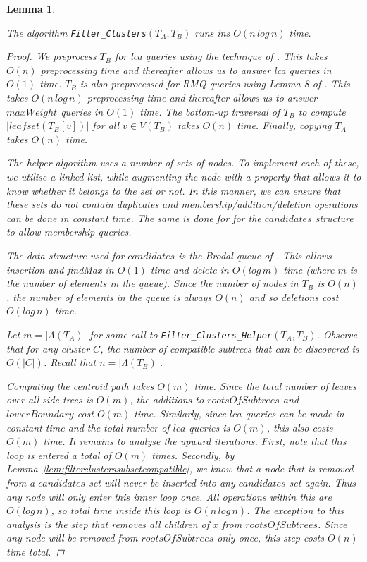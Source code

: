 \documentclass{article}
\newcommand{\leafset}{\Lambda}
\newtheorem{filterclustersruntime}[incompatibility]{Lemma}
\begin{document}
    \bigskip
    \begin{filterclustersruntime}
        \label{lem:filterclustersruntime}

        The algorithm \texttt{Filter\_Clusters}$(T_A, T_B)$ runs ins $O(n\,log\,n)$ time.

        \begin{proof}
            We preprocess $T_B$ for \textit{lca} queries using the technique of \cite{bender2000lca}. This takes $O(n)$ preprocessing time and thereafter allows us to answer \textit{lca} queries in $O(1)$ time. $T_B$ is also preprocessed for RMQ queries using Lemma 8 of \cite{jansson2018algorithms}. This takes $O(n\,log\,n)$ preprocessing time and thereafter allows us to answer $maxWeight$ queries in $O(1)$ time. The bottom-up traversal of $T_B$ to compute $|leafset(T_B[v])|$ for all $v \in V(T_B)$ takes $O(n)$ time. Finally, copying $T_A$ takes $O(n)$ time.

            The helper algorithm uses a number of sets of nodes. To implement each of these, we utilise a linked list, while augmenting the node with a property that allows it to know whether it belongs to the set or not. In this manner, we can ensure that these sets do not contain duplicates and membership/addition/deletion operations can be done in constant time. The same is done for for the $candidates$ structure to allow membership queries.

            The data structure used for $candidates$ is the Brodal queue of \cite{brodal1995fast}. This allows insertion and findMax in $O(1)$ time and delete in $O(log\,m)$ time (where $m$ is the number of elements in the queue). Since the number of nodes in $T_B$ is $O(n)$, the number of elements in the queue is always $O(n)$ and so deletions cost $O(log\,n)$ time.

            Let $m = |\leafset(T_A)|$ for some call to \texttt{Filter\_Clusters\_Helper}$(T_A, T_B)$. Observe that for any cluster $C$, the number of compatible subtrees that can be discovered is $O(|C|)$. Recall that $n = |\leafset(T_B)|$.

            Computing the centroid path takes $O(m)$ time. Since the total number of leaves over all side trees is $O(m)$, the additions to $rootsOfSubtrees$ and $lowerBoundary$ cost $O(m)$ time. Similarly, since $lca$ queries can be made in constant time and the total number of $lca$ queries is $O(m)$, this also costs $O(m)$ time. It remains to analyse the upward iterations. First, note that this loop is entered a total of $O(m)$ times. Secondly, by Lemma~\ref{lem:filterclusterssubsetcompatible}, we know that a node that is removed from a $candidates$ set will never be inserted into any $candidates$ set again. Thus any node will only enter this inner loop once. All operations within this are $O(log\,n)$, so total time inside this loop is $O(n\,log\,n)$. The exception to this analysis is the step that removes all children of $x$ from $rootsOfSubtrees$. Since any node will be removed from $rootsOfSubtrees$ only once, this step costs $O(n)$ time total.


\end{proof}
\end{filterclustersruntime}
\end{document}
